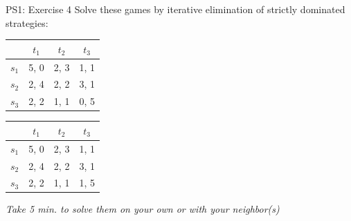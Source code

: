 \begin{frame}{PS1: Exercise 4}
Solve these games by iterative elimination of strictly dominated strategies:
\begin{multicols}{2}
\begin{table}
  \begin{tabular}{c|c|c|c}
          & $t_1$ & $t_2$ & $t_3$ \\
    \midrule
    $s_1$ & 5, 0  & 2, 3  & 1, 1 \\
    \midrule
    $s_2$ & 2, 4  & 2, 2  & 3, 1 \\
    \midrule
    $s_3$ & 2, 2  & 1, 1  & 0, 5
  \end{tabular}
\end{table}
\vfill\null
\columnbreak
\begin{table}
  \begin{tabular}{c|c|c|c}
          & $t_1$ & $t_2$ & $t_3$ \\
    \midrule
    $s_1$ & 5, 0  & 2, 3  & 1, 1 \\
    \midrule
    $s_2$ & 2, 4  & 2, 2  & 3, 1 \\
    \midrule
    $s_3$ & 2, 2  & 1, 1  & 1, 5
  \end{tabular}
\end{table}
\vfill\null
\end{multicols}
\textit{Take 5 min. to solve them on your own or with your neighbor(s)}
\end{frame}

